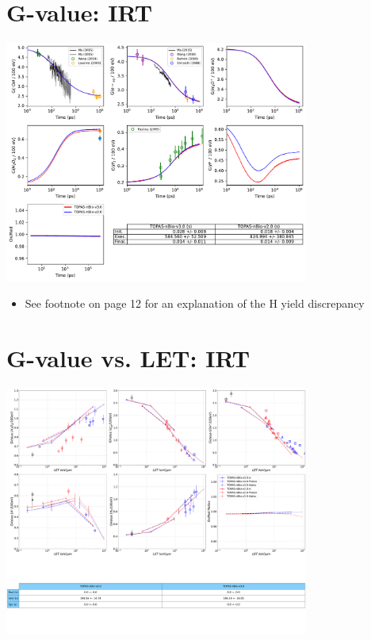 \documentclass[aspectratio=1610]{beamer}
\begin{document}
\section{G-value: IRT}

\begin{frame}{\secname}
 \centering
  \includegraphics[width=0.75\textwidth]{./GvalueIRT/GvalueIRT}
\begin{itemize}
\item \tiny{See footnote on page 12 for an explanation of the H yield discrepancy}
\end{itemize}
\end{frame}

\section{G-value vs. LET: IRT}

\begin{frame}{\secname}
 \centering
  \includegraphics[width=0.75\textwidth]{./Gvalue_LET-IRT/Gvalue_LET-IRT}
\end{frame}
\end{document}
